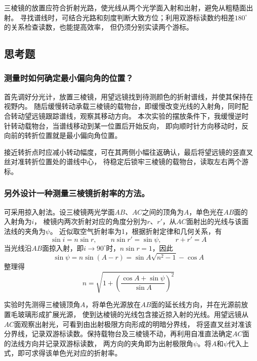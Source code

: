 \documentclass[10pt,a4paper]{ctexart} %
\begin{document}
    三棱镜的放置应符合折射光路，使光线从两个光学面入射和出射，避免从粗糙面出射。
    寻找谱线时，可结合光路和刻度判断大致方位；利用双游标读数约相差$180^\circ$的关系检查读数，也能提高效率，
    但仍须分别实读两个游标。

  \subsection{思考题}

    \subsubsection{测量时如何确定最小偏向角的位置？}

    首先调好分光计，放置三棱镜，用望远镜找到待测颜色的折射谱线，并使其保持在视野内。
    随后缓慢转动承载三棱镜的载物台，即缓慢改变光线的入射角，同时配合转动望远镜跟踪谱线，观察其移动方向。
    本次实验的摆放条件下，我缓慢逆时针转动载物台，当谱线移动到某一位置后开始反向，
    即向顺时针方向移动时，反向前的转折位置就是最小偏向角位置。

    接近转折点时应减小转动幅度，可在其两侧小幅往返确认，最后将望远镜的竖直叉丝对准转折位置处的谱线中心，
    待稳定后锁牢三棱镜的载物台，读取左右两个游标。
    

    \subsubsection{另外设计一种测量三棱镜折射率的方法。}

    可采用掠入射法。设三棱镜两光学面$AB$、$AC$之间的顶角为$A$，单色光在$AB$面的入射角为$i$，
    棱镜内两次折射对应的角度分别为$r$、$r'$，从$AC$面射出的光线与该面法线的夹角为$\psi$。
    近似取空气折射率为1，根据折射定律和几何关系，有
    \[
    \sin i=n\sin r,\qquad
    n\sin r'=\sin\psi,\qquad
    r+r'=A
    \]
    当光线沿$AB$面掠入射，即$i\to90^\circ$时，$n\sin r=1$，因此
    \[
    \sin\psi=n\sin(A-r)
    =\sin A\sqrt{n^2-1}-\cos A
    \]
    整理得
    \[
    \boxed{n=\sqrt{1+\left(\frac{\cos A+\sin\psi}{\sin A}\right)^2}}
    \]

    实验时先测得三棱镜顶角$A$，将单色光源放在$AB$面的延长线方向，并在光源前放置毛玻璃形成扩展光源，
    使到达棱镜的光线包含接近掠入射的光线。用望远镜从$AC$面观察出射光，可看到由出射极限方向形成的明暗分界线，
    将竖直叉丝对准该分界线，记录双游标读数。保持载物台及三棱镜不动，再利用自准直法确定$AC$面的法线方向并记录双游标读数，
    两方向的夹角即为出射极限角$\psi$。将$A$和$\psi$代入上式，即可求得该单色光对应的折射率。
\end{document}
